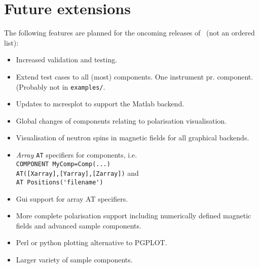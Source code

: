\section{Future extensions}
\label{s:future}
The following features are planned for the oncoming releases of \MCS\
(not an ordered list):
\begin{itemize}
\item Increased validation and testing.
\item Extend test cases to all (most) components. One instrument
  pr. component. (Probably not in \verb+examples/+.
\item Updates to mcresplot to support the Matlab backend.
\item Global changes of components relating to polarisation
  visualisation.
\item Visualisation of neutron spins in magnetic fields for all
  graphical backends.
\item \emph{Array} \verb+AT+ specifiers for components, i.e. \\
  \verb+COMPONENT MyComp=Comp(...)+\\\verb+AT([Xarray],[Yarray],[Zarray])+ and\\
  \verb+AT Positions('filename')+
\item Gui support for array AT specifiers.
\item More complete polarisation support including numerically defined
  magnetic fields and advanced sample components.
\item Perl or python plotting alternative to PGPLOT.
\item Larger variety of sample components.
\end{itemize}








